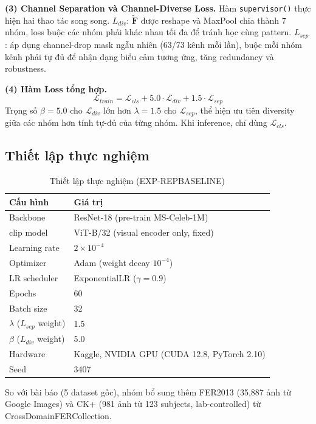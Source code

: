 \documentclass[12pt,a4paper]{article}
\let\oldtextbf\textbf
\renewcommand{\textbf}[1]{\oldtextbf{\textcolor{hcmublue}{#1}}}
\begin{document}
\textbf{(3) Channel Separation và Channel-Diverse Loss.}
Hàm \texttt{supervisor()} thực hiện hai thao tác song song. $L_{div}$: $\tilde{\mathbf{F}}$ được reshape và MaxPool chia thành 7 nhóm, loss buộc các nhóm phải khác nhau tối đa để tránh học cùng pattern. $L_{sep}$: áp dụng channel-drop mask ngẫu nhiên (63/73 kênh mỗi lần), buộc mỗi nhóm kênh phải tự đủ để nhận dạng biểu cảm tương ứng, tăng redundancy và robustness.

\textbf{(4) Hàm Loss tổng hợp.}
\begin{equation}
    \mathcal{L}_{train} = \mathcal{L}_{cls} + 5.0 \cdot \mathcal{L}_{div} + 1.5 \cdot \mathcal{L}_{sep}
\end{equation}
Trọng số $\beta = 5.0$ cho $\mathcal{L}_{div}$ lớn hơn $\lambda = 1.5$ cho $\mathcal{L}_{sep}$, thể hiện ưu tiên diversity giữa các nhóm hơn tính tự-đủ của từng nhóm. Khi inference, chỉ dùng $\mathcal{L}_{cls}$.

\subsection{Thiết lập thực nghiệm}

\begin{table}[H]
\centering
\begin{tabular}{ll}
\toprule
\textbf{Cấu hình} & \textbf{Giá trị} \\
\midrule
Backbone & ResNet-18 (pre-train MS-Celeb-1M) \\
\gls{clip} model & ViT-B/32 (visual encoder only, fixed) \\
Learning rate & $2 \times 10^{-4}$ \\
Optimizer & Adam (weight decay $10^{-4}$) \\
LR scheduler & ExponentialLR ($\gamma = 0.9$) \\
Epochs & 60 \\
Batch size & 32 \\
$\lambda$ ($L_{sep}$ weight) & 1.5 \\
$\beta$ ($L_{div}$ weight) & 5.0 \\
Hardware & Kaggle, NVIDIA GPU (CUDA 12.8, PyTorch 2.10) \\
Seed & 3407 \\
\bottomrule
\end{tabular}
\caption{Thiết lập thực nghiệm (EXP-REPBASELINE)}
\label{tab:exp_setup}
\end{table}

So với bài báo (5 dataset gốc), nhóm bổ sung thêm FER2013 (35,887 ảnh từ Google Images) và CK+ (981 ảnh từ 123 subjects, lab-controlled) từ CrossDomainFERCollection.
\end{document}
